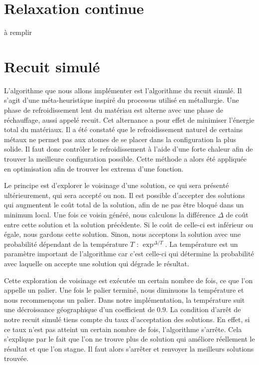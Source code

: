 \documentclass{article}
\begin{document}
\section{Relaxation continue}

à remplir

\section{Recuit simulé}

L'algorithme que nous allons implémenter est l'algorithme du recuit simulé.
Il s'agit d'une méta-heuristique inspiré du processus utilisé en métallurgie.
Une phase de refroidissement lent du matériau est alterne avec une phase de réchauffage, aussi appelé recuit.
Cet alternance a pour effet de minimiser l'énergie total du matériaux.
Il a été constaté que le refroidissement naturel de certains métaux ne permet pas aux atomes de se placer dans la configuration la plus solide.
Il faut donc contrôler le refroidissement à l'aide d'une forte chaleur afin de trouver la meilleure configuration possible.
Cette méthode a alors été appliquée en optimisation afin de trouver les extrema d'une fonction.

Le principe est d'explorer le voisinage d'une solution, ce qui sera présenté ultérieurement, qui sera accepté ou non.
Il est possible d'accepter des solutions qui augmentent le coût total de la solution, afin de ne pas être bloqué dans un minimum local.\newline
Une fois ce voisin généré, nous calculons la différence $\Delta$ de coût entre cette solution et la solution précédente.
Si le coût de celle-ci est inférieur ou égale, nous gardons cette solution.
Sinon, nous acceptons la solution avec une probabilité dépendant de la température $T$ : $\exp^{\Delta / T}$.\newline
La température est un paramètre important de l'algorithme car c'est celle-ci qui détermine la probabilité avec laquelle on accepte une solution qui dégrade le résultat.

Cette exploration de voisinage est exécutée un certain nombre de fois, ce que l'on appelle un palier.
Une fois le palier terminé, nous diminuons la température et nous recommençons un palier.
Dans notre implémentation, la température suit une décroissance géographique d'un coefficient de $0.9$.
La condition d'arrêt de notre recuit simulé tiens compte du taux d'acceptation des solutions.
En effet, si ce taux n'est pas atteint un certain nombre de fois, l'algorithme s'arrête.
Cela s'explique par le fait que l'on ne trouve plus de solution qui améliore réellement le résultat et que l'on stagne. Il faut alors s'arrêter et renvoyer la meilleurs solutions trouvée.
\end{document}
